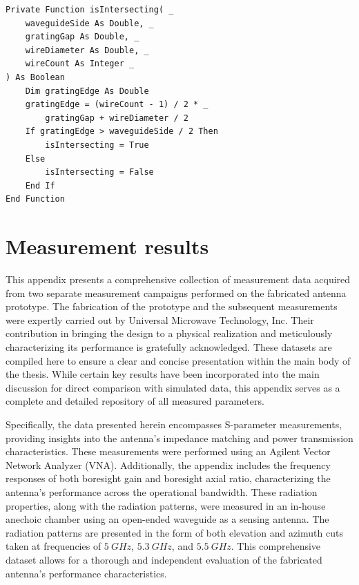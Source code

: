 \documentclass[11pt,a4paper,twoside,openany]{report}
\begin{document}
\begin{lstlisting}[caption={Check for intersection with waveguide walls}, label={lst:is-intersecting}, language=VBScript]
Private Function isIntersecting( _
    waveguideSide As Double, _
    gratingGap As Double, _
    wireDiameter As Double, _
    wireCount As Integer _
) As Boolean
    Dim gratingEdge As Double
    gratingEdge = (wireCount - 1) / 2 * _
        gratingGap + wireDiameter / 2
    If gratingEdge > waveguideSide / 2 Then
        isIntersecting = True
    Else
        isIntersecting = False
    End If
End Function
\end{lstlisting}

\chapter{Measurement results}
\label{appendix:measurement-results}
This appendix presents a comprehensive collection of measurement data acquired from two separate measurement campaigns performed on the fabricated antenna prototype. The fabrication of the prototype and the subsequent measurements were expertly carried out by Universal Microwave Technology, Inc. Their contribution in bringing the design to a physical realization and meticulously characterizing its performance is gratefully acknowledged. These datasets are compiled here to ensure a clear and concise presentation within the main body of the thesis. While certain key results have been incorporated into the main discussion for direct comparison with simulated data, this appendix serves as a complete and detailed repository of all measured parameters.

Specifically, the data presented herein encompasses S-parameter measurements, providing insights into the antenna's impedance matching and power transmission characteristics. These measurements were performed using an Agilent Vector Network Analyzer (VNA). Additionally, the appendix includes the frequency responses of both boresight gain and boresight axial ratio, characterizing the antenna's performance across the operational bandwidth. These radiation properties, along with the radiation patterns, were measured in an in-house anechoic chamber using an open-ended waveguide as a sensing antenna. The radiation patterns are presented in the form of both elevation and azimuth cuts taken at frequencies of $\qty{5}{GHz}$, $\qty{5.3}{GHz}$, and $\qty{5.5}{GHz}$. This comprehensive dataset allows for a thorough and independent evaluation of the fabricated antenna's performance characteristics.
\end{document}
